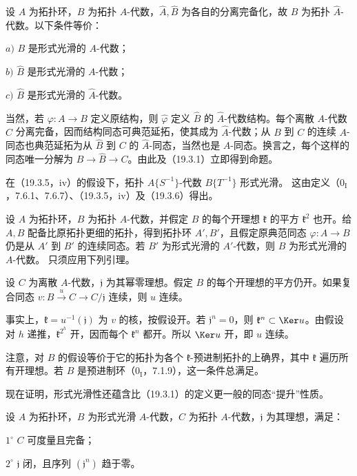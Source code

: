 设 $A$ 为拓扑环，$B$ 为拓扑 $A$-代数，$\widehat A,\widehat B$ 为各自的分离完备化，故 $\widehat B$ 为拓扑 $\widehat A$-代数。以下条件等价：

$a)$ $B$ 是形式光滑的 $A$-代数；

$b)$ $\widehat B$ 是形式光滑的 $A$-代数；

$c)$ $\widehat B$ 是形式光滑的 $\widehat A$-代数。

当然，若 $\varphi:A\to B$ 定义原结构，则 $\widehat\varphi$ 定义 $\widehat B$ 的 $\widehat A$-代数结构。每个离散 $A$-代数 $C$ 分离完备，因而结构同态可典范延拓，使其成为 $\widehat A$-代数；从 $B$ 到 $C$ 的连续 $A$-同态也典范延拓为从 $\widehat B$ 到 $C$ 的 $\widehat A$-同态，当然也是 $A$-同态。换言之，每个这样的同态唯一分解为 $B\to\widehat B\to C$。由此及（19.3.1）立即得到命题。

在（19.3.5，iv）的假设下，拓扑 $A\{S^{-1}\}$-代数 $B\{T^{-1}\}$ 形式光滑。
这由定义（$0_{\mathrm I}$，7.6.1、7.6.7）、（19.3.5，iv）及（19.3.6）得出。

设 $A$ 为拓扑环，$B$ 为拓扑 $A$-代数，并假定 $B$ 的每个开理想 $\mathfrak k$ 的平方 $\mathfrak k^2$ 也开。给 $A,B$ 配备比原拓扑更细的拓扑，得到拓扑环 $A',B'$，且假定原典范同态 $\varphi:A\to B$ 仍是从 $A'$ 到 $B'$ 的连续同态。若 $B'$ 为形式光滑的 $A'$-代数，则 $B$ 为形式光滑的 $A$-代数。
只须应用下列引理。

设 $C$ 为离散 $A$-代数，$\mathfrak j$ 为其幂零理想。假定 $B$ 的每个开理想的平方仍开。如果复合同态 $v:B\xrightarrow{u}C\to C/\mathfrak j$ 连续，则 $u$ 连续。

事实上，$\mathfrak k=u^{-1}(\mathfrak j)$ 为 $v$ 的核，按假设开。若 $\mathfrak j^n=0$，则 $\mathfrak k^n\subset\Ker u$。由假设对 $h$ 递推，$\mathfrak k^{2^h}$ 开，因而每个 $\mathfrak k^n$ 都开。所以 $\Ker u$ 开，即 $u$ 连续。

注意，对 $B$ 的假设等价于它的拓扑为各个 $\mathfrak k$-预进制拓扑的上确界，其中 $\mathfrak k$ 遍历所有开理想。若 $B$ 是预进制环（$0_{\mathrm I}$，7.1.9），这一条件总满足。

现在证明，形式光滑性还蕴含比（19.3.1）的定义更一般的同态“提升”性质。

设 $A$ 为拓扑环，$B$ 为形式光滑 $A$-代数，$C$ 为拓扑 $A$-代数，$\mathfrak j$ 为其理想，满足：

$1^\circ$ $C$ 可度量且完备；

$2^\circ$ $\mathfrak j$ 闭，且序列 $(\mathfrak j^n)$ 趋于零。

